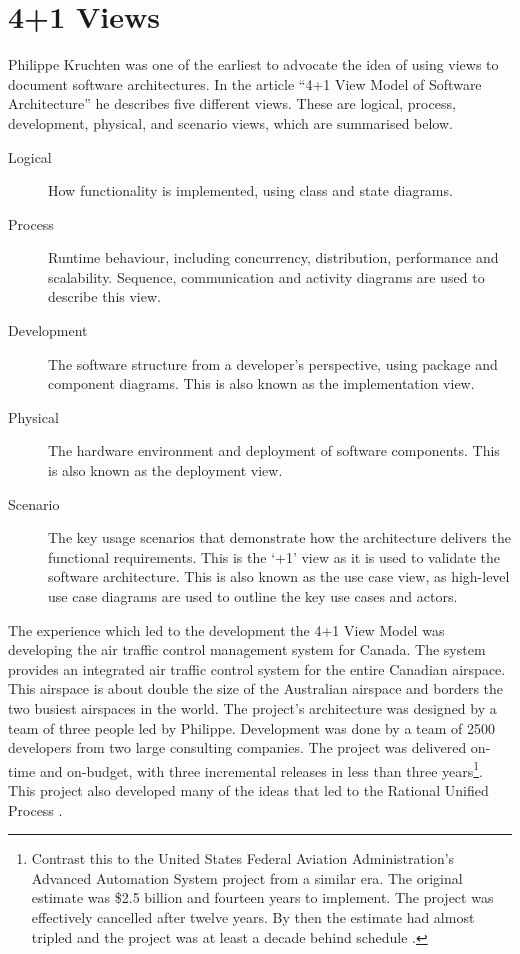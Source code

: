 \section{4+1 Views}
Philippe Kruchten was one of the earliest to advocate the idea of using views to document software architectures.
In the article ``4+1 View Model of Software Architecture'' \cite{4+1-model} he describes five different views.
These are logical, process, development, physical, and scenario views, which are summarised below.
\begin{description}
    \item[Logical] How functionality is implemented, using class and state diagrams.
    \item[Process] Runtime behaviour, including concurrency, distribution, performance and scalability.
                            Sequence, communication and activity diagrams are used to describe this view.
    \item[Development] The software structure from a developer's perspective, using package and component diagrams.
                                    This is also known as the implementation view.
    \item[Physical] The hardware environment and deployment of software components.
                            This is also known as the deployment view.
    \item[Scenario] The key usage scenarios that demonstrate how the architecture delivers the functional requirements.
                             This is the `+1' view as it is used to validate the software architecture.
                             This is also known as the use case view, as high-level use case diagrams are used to outline the key use cases and actors.
\end{description}
The experience which led to the development the 4+1 View Model was developing the air traffic control management system for Canada.
The system provides an integrated air traffic control system for the entire Canadian airspace.
This airspace is about double the size of the Australian airspace and borders the two busiest airspaces in the world.
The project's architecture was designed by a team of three people led by Philippe.
Development was done by a team of 2500 developers from two large consulting companies.
The project was delivered on-time and on-budget, with three incremental releases in less than three years\footnote{Contrast
this to the United States Federal Aviation Administration's Advanced Automation System project from a similar era.
The original estimate was \$2.5 billion and fourteen years to implement.
The project was effectively cancelled after twelve years.
By then the estimate had almost tripled and the project was at least a decade behind schedule \cite{faa-aas}.}.
This project also developed many of the ideas that led to the Rational Unified Process \cite{kruchten2004rational}.

